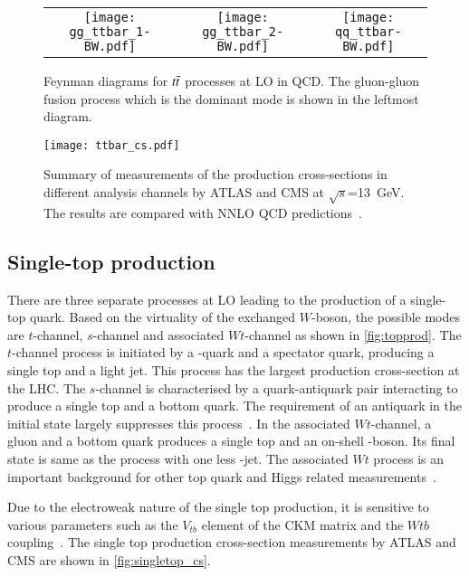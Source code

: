 \begin{figure}[htbp]
    \centering
    \begin{tabular}{ccc}
        \texttt{[image: gg\_ttbar\_1-BW.pdf]} &
        \texttt{[image: gg\_ttbar\_2-BW.pdf]} &
        \texttt{[image: qq\_ttbar-BW.pdf]} \\[1ex]
    \end{tabular}
    \caption[Feynman diagrams for $t\Bar{t}$ processes at LO in QCD]{Feynman diagrams for $t\Bar{t}$ processes at LO in QCD. The gluon-gluon fusion
    process which is the dominant mode is shown in the leftmost diagram. }
    \label{fig:ttbarprod}
\end{figure}

\begin{figure}[htbp]
    \centering
    \texttt{[image: ttbar\_cs.pdf]}
    \caption[Cross-section of the \ttbar process]{Summary of measurements of the \ttbar production
    cross-sections in different analysis channels by ATLAS and CMS at $\sqrt{s}$=\qty{13}{\GeV}. The 
    results are compared with NNLO QCD predictions~\cite{ATL-PHYS-PUB-2024-006}.}%
    \label{fig:ttbar_cs}
\end{figure}

\subsection*{Single-top production}
There are three separate processes at LO leading to the production of a single-top quark.
Based on the virtuality of the exchanged $W$-boson, the possible modes
are $t$-channel, $s$-channel and associated $Wt$-channel as shown in \cref{fig:topprod}.
The $t$-channel process is initiated by a \Pbottom-quark and a spectator quark, producing 
a single top and a light jet. This process has the largest production cross-section at the LHC.
The $s$-channel is characterised by a quark-antiquark pair interacting to produce
a single top and a bottom quark. The requirement of an antiquark in the initial state largely
suppresses this process~\cite{Cristinziani_2017}. In the associated $Wt$-channel,
a gluon and a bottom quark produces a single top and an on-shell \PW-boson. Its final state is 
same as the \ttbar process with one less \Pbottom-jet. The associated $Wt$ process is an 
important background for other top quark and Higgs related measurements~\cite{ATLAS:2024ppp}.

Due to the electroweak
nature of the single top production, it is sensitive to various parameters such as 
the $V_{tb}$ element of the CKM matrix and the $Wtb$ coupling~\cite{Andrea:2023yap}. The 
single top production cross-section measurements by ATLAS and CMS are shown in \cref{fig:singletop_cs}.

